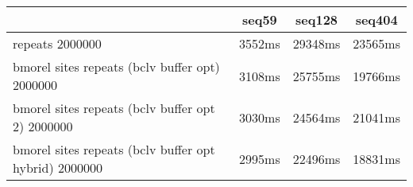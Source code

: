\begin{tabular}{|l|c|c|c|}
\hline
 & seq59 & seq128 & seq404  \\
\hline
repeats 2000000 &  3552ms &  29348ms &  23565ms\\
\hline
bmorel sites repeats (bclv buffer opt) 2000000 &  3108ms &  25755ms &  19766ms\\
\hline
bmorel sites repeats (bclv buffer opt 2) 2000000 &  3030ms &  24564ms &  21041ms\\
\hline
bmorel sites repeats (bclv buffer opt hybrid) 2000000 &  2995ms &  22496ms &  18831ms\\
\hline
\end{tabular}
